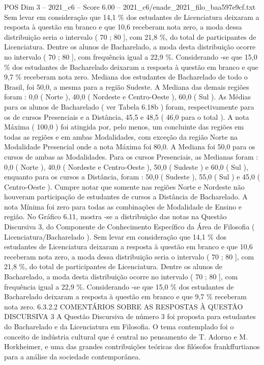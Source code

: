 \begin{textsample}{POS Dim 3 – 2021\_c6 – Score 6.00 – 2021\_c6/enade\_2021\_filo\_baa597e9cf.txt}
Sem levar em consideração que 14,1 \% dos estudantes de Licenciatura deixaram a resposta à questão em branco e que 10,6 receberam nota zero, a moda dessa distribuição seria o intervalo ( 70 ; 80 ], com 21,8 \%, do total de participantes de Licenciatura.
Dentre os alunos de Bacharelado, a moda desta distribuição ocorre no intervalo ( 70 ; 80 ], com frequência igual a 22,9 \%.
Considerando -se que 15,0 \% dos estudantes de Bacharelado deixaram a resposta à questão em branco e que 9,7 \% receberam nota zero.
Mediana dos estudantes de Bacharelado de todo o Brasil, foi 50,0, a mesma para a região Sudeste.
A Mediana das demais regiões foram : 0,0 ( Norte ), 40,0 ( Nordeste e Centro-Oeste ), 60,0 ( Sul ).
As Médias para os alunos de Bacharelado ( ver Tabela 6.18b ) foram, respectivamente para os de cursos Presenciais e a Distância, 45,5 e 48,5 ( 46,0 para o total ).
A nota Máxima ( 100,0 ) foi atingida por, pelo menos, um concluinte das regiões em todas as regiões e em ambas Modalidades, com exceção da região Norte na Modalidade Presencial onde a nota Máxima foi 80,0.
A Mediana foi 50,0 para os cursos de ambas as Modalidades.
Para os cursos Presenciais, as Medianas foram : 0,0 ( Norte ), 40,0 ( Nordeste e Centro-Oeste ), 50,0 ( Sudeste ) e 60,0 ( Sul ), enquanto para os cursos a Distância, foram : 50,0 ( Sudeste ), 55,0 ( Sul ) e 45,0 ( Centro-Oeste ).
Cumpre notar que somente nas regiões Norte e Nordeste não houveram participação de estudantes de cursos a Distância de Bacharelado.
A nota Mínima foi zero para todas as combinações de Modalidade de Ensino e região.
No Gráfico 6.11, mostra -se a distribuição das notas na Questão Discursiva 3, do Componente de Conhecimento Específico da Área de Filosofia ( Licenciatura/Bacharelado ).
Sem levar em consideração que 14,1 \% dos estudantes de Licenciatura deixaram a resposta à questão em branco e que 10,6 receberam nota zero, a moda dessa distribuição seria o intervalo ( 70 ; 80 ], com 21,8 \%, do total de participantes de Licenciatura.
Dentre os alunos de Bacharelado, a moda desta distribuição ocorre no intervalo ( 70 ; 80 ], com frequência igual a 22,9 \%.
Considerando -se que 15,0 \% dos estudantes de Bacharelado deixaram a resposta à questão em branco e que 9,7 \% receberam nota zero. 6.3.2.2 COMENTÁRIOS SOBRE AS RESPOSTAS À QUESTÃO DISCURSIVA 3 A Questão Discursiva de número 3 foi proposta para estudantes do Bacharelado e da Licenciatura em Filosofia.
O tema contemplado foi o conceito de indústria cultural que é central no pensamento de T.
Adorno e M.
Horkheimer, e uma das grandes contribuições teóricas dos filósofos frankffurtianos para a análise da sociedade contemporânea.

\end{textsample}

